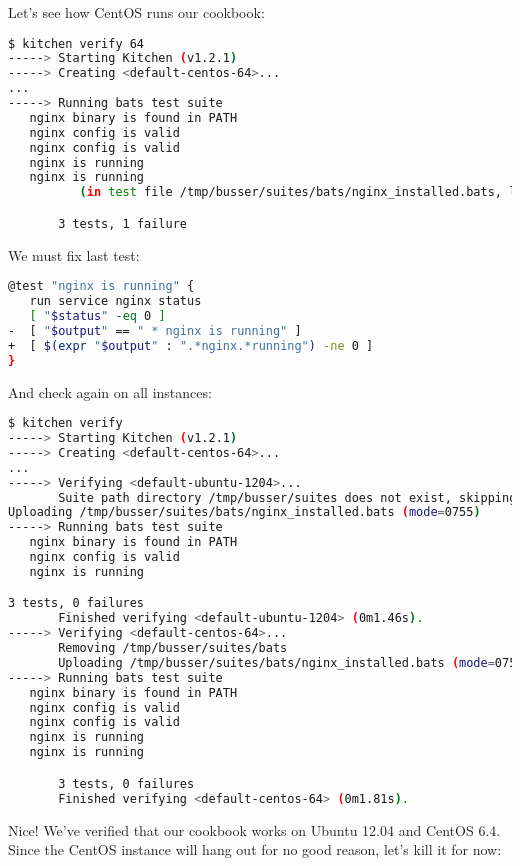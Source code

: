 Let's see how CentOS runs our cookbook:

\begin{lstlisting}[language=Bash,label=lst:testing-test-kitchen22]
$ kitchen verify 64
-----> Starting Kitchen (v1.2.1)
-----> Creating <default-centos-64>...
...
-----> Running bats test suite
   nginx binary is found in PATH
   nginx config is valid                                                    2/3
   nginx config is valid
   nginx is running                                                         3/3
   nginx is running
          (in test file /tmp/busser/suites/bats/nginx_installed.bats, line 16)

       3 tests, 1 failure
\end{lstlisting}

We must fix last test:

\begin{lstlisting}[language=Bash,label=lst:testing-test-kitchen23]
@test "nginx is running" {
   run service nginx status
   [ "$status" -eq 0 ]
-  [ "$output" == " * nginx is running" ]
+  [ $(expr "$output" : ".*nginx.*running") -ne 0 ]
}
\end{lstlisting}

And check again on all instances:

\begin{lstlisting}[language=Bash,label=lst:testing-test-kitchen24]
$ kitchen verify
-----> Starting Kitchen (v1.2.1)
-----> Creating <default-centos-64>...
...
-----> Verifying <default-ubuntu-1204>...
       Suite path directory /tmp/busser/suites does not exist, skipping.
Uploading /tmp/busser/suites/bats/nginx_installed.bats (mode=0755)
-----> Running bats test suite
   nginx binary is found in PATH
   nginx config is valid
   nginx is running

3 tests, 0 failures
       Finished verifying <default-ubuntu-1204> (0m1.46s).
-----> Verifying <default-centos-64>...
       Removing /tmp/busser/suites/bats
       Uploading /tmp/busser/suites/bats/nginx_installed.bats (mode=0755)
-----> Running bats test suite
   nginx binary is found in PATH
   nginx config is valid                                                    2/3
   nginx config is valid
   nginx is running                                                         3/3
   nginx is running

       3 tests, 0 failures
       Finished verifying <default-centos-64> (0m1.81s).
\end{lstlisting}

Nice! We've verified that our cookbook works on Ubuntu 12.04 and CentOS 6.4. Since the CentOS instance will hang out for no good reason, let's kill it for now:

